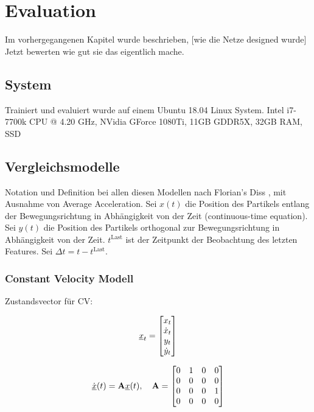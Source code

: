 \chapter{Evaluation}

Im vorhergegangenen Kapitel wurde beschrieben, [wie die Netze designed wurde]
Jetzt bewerten wie gut sie das eigentlich mache.

\section{System}

Trainiert und evaluiert wurde auf einem Ubuntu 18.04 Linux System.
Intel i7-7700k CPU @ 4.20 GHz,
NVidia GForce 1080Ti, 11GB GDDR5X,
32GB RAM,
SSD 


\section{Vergleichsmodelle}

Notation und Definition bei allen diesen Modellen nach Florian's Diss \cite{Pfaff2018}, mit Ausnahme von Average Acceleration.
Sei \(x(t)\) die Position des Partikels entlang der Bewegungsrichtung in Abhängigkeit von der Zeit
(continuous-time equation).
Sei \( y(t)\) die Position des Partikels orthogonal zur Bewegungsrichtung in Abhängigkeit von der Zeit.
\(t^{\text{Last}}\) ist der Zeitpunkt der Beobachtung des letzten Features.
Sei \(\Delta t =  t - t^{\text{Last}}\).


\subsection{Constant Velocity Modell}

Zustandsvector für CV:

 \begin{equation*} \label{eq:definitionCV}
    {\underline{x}}_t = 
    \begin{bmatrix}
        x_t \\
        \dot{x}_t \\
        y_t \\
        \dot{y}_t
       \end{bmatrix} 
\end{equation*}

\begin{equation*} \label{eq:speedCV}
    \dot{{\underline{x}}}(t) = {{\mathbf{A}}}{\underline{x}}(t), \quad {\ensuremath{{\mathbf{A}}}} = 
    \begin{bmatrix}
        0 & 1 & 0 & 0 \\
        0 & 0 & 0 & 0 \\
        0 & 0 & 0 & 1\\
        0 & 0 & 0 & 0
    \end{bmatrix} 
\end{equation*}

